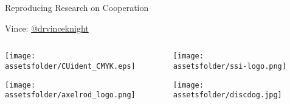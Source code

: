 \documentclass{beamer}
\newcommand{\assetsfolder}{./assets}
\begin{document}
    \begin{frame}
        \begin{center}
            \Huge
                Reproducing Research on Cooperation

               \vfill

            \Large
               Vince: \href{https://twitter.com/drvinceknight}{@drvinceknight}\\
        \end{center}

    \end{frame}

    \begin{frame}
               \begin{columns}
                   \begin{column}{.45\textwidth}
                       \begin{center}
                       \texttt{[image: \\assetsfolder/CUident\_CMYK.eps]}
                       \end{center}

                       \begin{center}
                       \texttt{[image: \\assetsfolder/axelrod\_logo.png]}
                       \end{center}
                   \end{column}
                   \begin{column}{.45\textwidth}
                       \begin{center}
                       \texttt{[image: \\assetsfolder/ssi-logo.png]}
                       \end{center}

                       \pause
                       \begin{center}
                       \texttt{[image: \\assetsfolder/discdog.jpg]}
                       \end{center}
                   \end{column}
               \end{columns}

    \end{frame}
\end{document}
